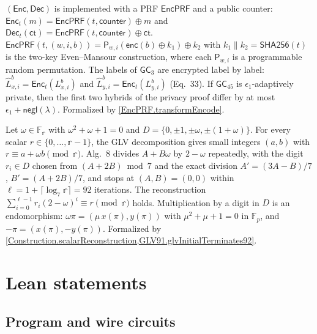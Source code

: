 \begin{paperclaim}\label{babe:claim7}
$(\mathsf{Enc}, \mathsf{Dec})$ is implemented with a PRF $\mathsf{EncPRF}$ and a public counter: $\mathsf{Enc}_t(m) = \mathsf{EncPRF}(t, \mathsf{counter}) \oplus m$ and $\mathsf{Dec}_t(\mathsf{ct}) = \mathsf{EncPRF}(t, \mathsf{counter}) \oplus \mathsf{ct}$.
$\mathsf{EncPRF}(t, (w, i, b)) = \mathsf{P}_{w,i}(\mathsf{enc}(b) \oplus k_1) \oplus k_2$ with $k_1 \| k_2 = \mathsf{SHA256}(t)$ is the two-key Even--Mansour construction, where each $\mathsf{P}_{w,i}$ is a programmable random permutation.
The labels of $\mathsf{GC}_3$ are encrypted label by label: $\hat L^b_{x,i} = \mathsf{Enc}_t(L^b_{x,i})$ and $\hat L^b_{y,i} = \mathsf{Enc}_t(L^b_{y,i})$ (Eq.~33).
If $\mathsf{GC}_{45}$ is $\epsilon_1$-adaptively private, then the first two hybrids of the privacy proof differ by at most $\epsilon_1 + \mathsf{negl}(\lambda)$.
Formalized by \cref{EncPRF.transformEncode}.
\end{paperclaim}

\begin{paperalg}\label{babe:alg8}
Let $\omega \in \mathbb{F}_{\mathbb{r}}$ with $\omega^2 + \omega + 1 = 0$ and $D = \{0, \pm 1, \pm\omega, \pm(1 + \omega)\}$.
For every scalar $r \in \{0, \ldots, \mathbb{r} - 1\}$, the GLV decomposition gives small integers $(a, b)$ with $r \equiv a + \omega b \pmod{\mathbb{r}}$.
Alg.~8 divides $A + B\omega$ by $2 - \omega$ repeatedly, with the digit $r_i \in D$ chosen from $(A + 2B) \bmod 7$ and the exact division $A' = (3A - B)/7$, $B' = (A + 2B)/7$, and stops at $(A, B) = (0, 0)$ within $\ell = 1 + \lceil \log_7 \mathbb{r} \rceil = 92$ iterations.
The reconstruction $\sum_{i=0}^{\ell-1} r_i (2-\omega)^i \equiv r \pmod{\mathbb{r}}$ holds.
Multiplication by a digit in $D$ is an endomorphism: $\omega \pi = (\mu\, x(\pi), y(\pi))$ with $\mu^2 + \mu + 1 = 0$ in $\mathbb{F}_p$, and $-\pi = (x(\pi), -y(\pi))$.
Formalized by \cref{Construction.scalarReconstruction,GLV91.glvInitialTerminates92}.
\end{paperalg}

\section{Lean statements}

\subsection{Program and wire circuits}

